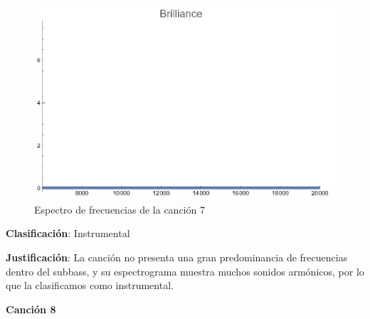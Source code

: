 \documentclass[12pt, letterpaper]{article}
\begin{document}
\begin{figure}[H]
\begin{minipage}{.3\textwidth}
  \end{minipage}
  \begin{minipage}{0.03\textwidth}\end{minipage}
  \begin{minipage}{.3\textwidth}
    \centering
    \includegraphics[width=.9\linewidth]{imgs/Cancion7/brilliance.png}
  \end{minipage}
  \caption{Espectro de frecuencias de la canción 7}
  \label{fig:esp07}
\end{figure}

\textbf{Clasificación}: Instrumental

\textbf{Justificación}: La canción no presenta una gran predominancia
de frecuencias dentro del subbass, y su espectrograma muestra muchos sonidos
armónicos, por lo que la clasificamos como instrumental.

\newpage

\textbf{\large{Canción 8}}
\end{document}
